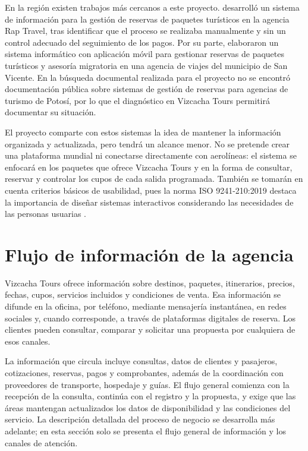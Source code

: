 En la región existen trabajos más cercanos a este proyecto.
\textcite{huaman2017} desarrolló un sistema de información para la gestión de
reservas de paquetes turísticos en la agencia Rap Travel, tras identificar
que el proceso se realizaba manualmente y sin un control adecuado del
seguimiento de los pagos. Por su parte, \textcite{miranda2022} elaboraron un
sistema informático con aplicación móvil para gestionar reservas de paquetes
turísticos y asesoría migratoria en una agencia de viajes del municipio de
San Vicente. En la búsqueda documental realizada para el proyecto no se
encontró documentación pública sobre sistemas de gestión de reservas para
agencias de turismo de Potosí, por lo que el diagnóstico en Vizcacha Tours
permitirá documentar su situación.

El proyecto comparte con estos sistemas la idea de mantener la información
organizada y actualizada, pero tendrá un alcance menor. No se pretende crear
una plataforma mundial ni conectarse directamente con aerolíneas: el sistema
se enfocará en los paquetes que ofrece Vizcacha Tours y en la forma de
consultar, reservar y controlar los cupos de cada salida programada. También
se tomarán en cuenta criterios básicos de usabilidad, pues la norma ISO
9241-210:2019 destaca la importancia de diseñar sistemas interactivos
considerando las necesidades de las personas usuarias \parencite{iso9241}.

\section{Flujo de información de la agencia}

Vizcacha Tours ofrece información sobre destinos, paquetes, itinerarios,
precios, fechas, cupos, servicios incluidos y condiciones de venta. Esa
información se difunde en la oficina, por teléfono, mediante mensajería
instantánea, en redes sociales y, cuando corresponde, a través de plataformas
digitales de reserva. Los clientes pueden consultar, comparar y solicitar una
propuesta por cualquiera de esos canales.

La información que circula incluye consultas, datos de clientes y pasajeros,
cotizaciones, reservas, pagos y comprobantes, además de la coordinación con
proveedores de transporte, hospedaje y guías. El flujo general comienza con la
recepción de la consulta, continúa con el registro y la propuesta, y exige que
las áreas mantengan actualizados los datos de disponibilidad y las
condiciones del servicio. La descripción detallada del proceso de negocio se
desarrolla más adelante; en esta sección solo se presenta el flujo general de
información y los canales de atención.
